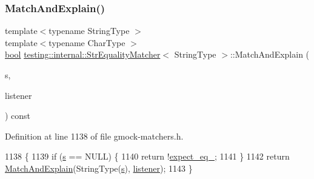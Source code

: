 \mbox{\label{classtesting_1_1internal_1_1StrEqualityMatcher_a72b8373d619e29ce27ed3ecdc6089b0b}} 
\subsubsection{\texorpdfstring{Match\+And\+Explain()}{MatchAndExplain()}\hspace{0.1cm}{\footnotesize\ttfamily [1/2]}}
{\footnotesize\ttfamily template$<$typename String\+Type $>$ \\
template$<$typename Char\+Type $>$ \\
\hyperlink{classbool}{bool} \hyperlink{classtesting_1_1internal_1_1StrEqualityMatcher}{testing\+::internal\+::\+Str\+Equality\+Matcher}$<$ String\+Type $>$\+::Match\+And\+Explain (\begin{DoxyParamCaption}\item[{Char\+Type $\ast$}]{s,  }\item[{\hyperlink{classtesting_1_1MatchResultListener}{Match\+Result\+Listener} $\ast$}]{listener }\end{DoxyParamCaption}) const\hspace{0.3cm}{\ttfamily [inline]}}



Definition at line 1138 of file gmock-\/matchers.\+h.


\begin{DoxyCode}
1138                                                                          \{
1139     \textcolor{keywordflow}{if} (\hyperlink{namespaceservice__node__3_aa976421a49e0b54f23833423400849ae}{s} == NULL) \{
1140       \textcolor{keywordflow}{return} !\hyperlink{classtesting_1_1internal_1_1StrEqualityMatcher_a95f7c07612ee34d8ebd1dc97c707901d}{expect\_eq\_};
1141     \}
1142     \textcolor{keywordflow}{return} \hyperlink{classtesting_1_1internal_1_1StrEqualityMatcher_a72b8373d619e29ce27ed3ecdc6089b0b}{MatchAndExplain}(StringType(\hyperlink{namespaceservice__node__3_aa976421a49e0b54f23833423400849ae}{s}), \hyperlink{namespaceinteractive__marker_a0e579ab555212bb5e2c9f8a675b7618a}{listener});
1143   \}
\end{DoxyCode}
\mbox{\label{classtesting_1_1internal_1_1StrEqualityMatcher_aedb1ac6fc8c15b318dfd8e99927aa2e1}} 
